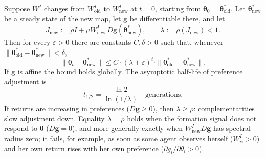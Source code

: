 \documentclass[../structural_economics_book.tex]{subfiles}
\begin{document}
\begin{proposition}\label{ch09:thm:hysteresis}
Suppose $W^I$ changes from $W^I_{\text{old}}$ to $W^I_{\text{new}}$ at $t = 0$, starting from $\boldsymbol{\theta}_0 = \boldsymbol{\theta}^*_{\text{old}}$. Let $\boldsymbol{\theta}^*_{\text{new}}$ be a steady state of the new map, let $\mathbf{g}$ be differentiable there, and let
\begin{equation}\label{ch09:eq:local_rate}
J_{\text{new}} := \rho I + \mu W^I_{\text{new}}\, D\mathbf{g}(\boldsymbol{\theta}^*_{\text{new}}), \qquad \lambda := \rho(J_{\text{new}}) < 1.
\end{equation}
Then for every $\varepsilon > 0$ there are constants $C, \delta > 0$ such that, whenever $\|\boldsymbol{\theta}^*_{\text{old}} - \boldsymbol{\theta}^*_{\text{new}}\| < \delta$,
\begin{equation}\label{ch09:eq:hysteresis}
\|\boldsymbol{\theta}_t - \boldsymbol{\theta}^*_{\text{new}}\| \leq C \cdot (\lambda + \varepsilon)^t \cdot \|\boldsymbol{\theta}^*_{\text{old}} - \boldsymbol{\theta}^*_{\text{new}}\|.
\end{equation}
If $\mathbf{g}$ is affine the bound holds globally. The asymptotic half-life of preference adjustment is
\begin{equation}\label{ch09:eq:halflife}
t_{1/2} = \frac{\ln 2}{\ln(1/\lambda)} \quad \text{generations}.
\end{equation}
If returns are increasing in preferences ($D\mathbf{g} \geq 0$), then $\lambda \geq \rho$: complementarities slow adjustment down. Equality $\lambda = \rho$ holds when the formation signal does not respond to $\boldsymbol{\theta}$ ($D\mathbf{g} = 0$), and more generally exactly when $W^I_{\text{new}}D\mathbf{g}$ has spectral radius zero; it fails, for example, as soon as some agent observes herself ($W^I_{ii} > 0$) and her own return rises with her own preference ($\partial g_i/\partial\theta_i > 0$).
\end{proposition}
\end{document}
